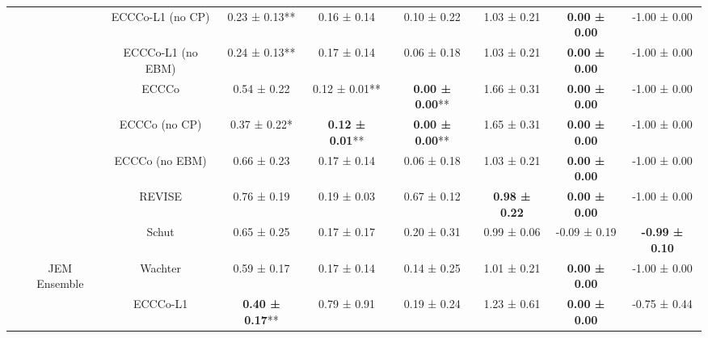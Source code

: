 \begin{longtable}[t]{ccccccccc}
 &  & ECCCo-L1 (no CP) & 0.23 ± 0.13** & 0.16 ± 0.14\hphantom{*}\hphantom{*} & 0.10 ± 0.22\hphantom{*}\hphantom{*} & 1.03 ± 0.21\hphantom{*}\hphantom{*} & \textbf{0.00 ± 0.00}\hphantom{*}\hphantom{*} & -1.00 ± 0.00\hphantom{*}\hphantom{*}\\

 &  & ECCCo-L1 (no EBM) & 0.24 ± 0.13** & 0.17 ± 0.14\hphantom{*}\hphantom{*} & 0.06 ± 0.18\hphantom{*}\hphantom{*} & 1.03 ± 0.21\hphantom{*}\hphantom{*} & \textbf{0.00 ± 0.00}\hphantom{*}\hphantom{*} & -1.00 ± 0.00\hphantom{*}\hphantom{*}\\

 &  & ECCCo & 0.54 ± 0.22\hphantom{*}\hphantom{*} & 0.12 ± 0.01** & \textbf{0.00 ± 0.00}** & 1.66 ± 0.31\hphantom{*}\hphantom{*} & \textbf{0.00 ± 0.00}\hphantom{*}\hphantom{*} & -1.00 ± 0.00\hphantom{*}\hphantom{*}\\

 &  & ECCCo (no CP) & 0.37 ± 0.22*\hphantom{*} & \textbf{0.12 ± 0.01}** & \textbf{0.00 ± 0.00}** & 1.65 ± 0.31\hphantom{*}\hphantom{*} & \textbf{0.00 ± 0.00}\hphantom{*}\hphantom{*} & -1.00 ± 0.00\hphantom{*}\hphantom{*}\\

 &  & ECCCo (no EBM) & 0.66 ± 0.23\hphantom{*}\hphantom{*} & 0.17 ± 0.14\hphantom{*}\hphantom{*} & 0.06 ± 0.18\hphantom{*}\hphantom{*} & 1.03 ± 0.21\hphantom{*}\hphantom{*} & \textbf{0.00 ± 0.00}\hphantom{*}\hphantom{*} & -1.00 ± 0.00\hphantom{*}\hphantom{*}\\

 &  & REVISE & 0.76 ± 0.19\hphantom{*}\hphantom{*} & 0.19 ± 0.03\hphantom{*}\hphantom{*} & 0.67 ± 0.12\hphantom{*}\hphantom{*} & \textbf{0.98 ± 0.22}\hphantom{*}\hphantom{*} & \textbf{0.00 ± 0.00}\hphantom{*}\hphantom{*} & -1.00 ± 0.00\hphantom{*}\hphantom{*}\\

 &  & Schut & 0.65 ± 0.25\hphantom{*}\hphantom{*} & 0.17 ± 0.17\hphantom{*}\hphantom{*} & 0.20 ± 0.31\hphantom{*}\hphantom{*} & 0.99 ± 0.06\hphantom{*}\hphantom{*} & -0.09 ± 0.19\hphantom{*}\hphantom{*} & \textbf{-0.99 ± 0.10}\hphantom{*}\hphantom{*}\\

 & \multirow[t]{-9}{*}{\centering\arraybackslash JEM Ensemble} & Wachter & 0.59 ± 0.17\hphantom{*}\hphantom{*} & 0.17 ± 0.14\hphantom{*}\hphantom{*} & 0.14 ± 0.25\hphantom{*}\hphantom{*} & 1.01 ± 0.21\hphantom{*}\hphantom{*} & \textbf{0.00 ± 0.00}\hphantom{*}\hphantom{*} & -1.00 ± 0.00\hphantom{*}\hphantom{*}\\
\cmidrule{2-9}
 &  & ECCCo-L1 & \textbf{0.40 ± 0.17}** & 0.79 ± 0.91\hphantom{*}\hphantom{*} & 0.19 ± 0.24\hphantom{*}\hphantom{*} & 1.23 ± 0.61\hphantom{*}\hphantom{*} & \textbf{0.00 ± 0.00}\hphantom{*}\hphantom{*} & -0.75 ± 0.44\hphantom{*}\hphantom{*}\\


\end{longtable}
